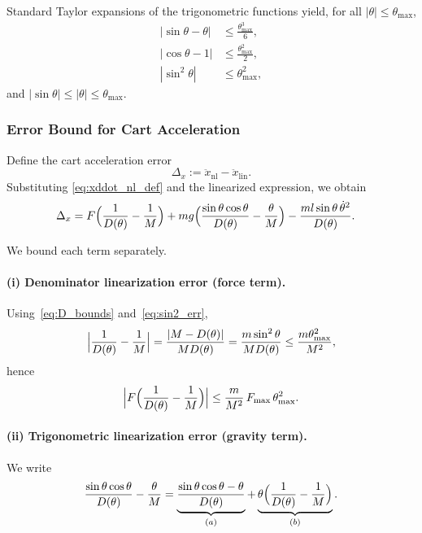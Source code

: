 \documentclass{article}
\begin{document}
Standard Taylor expansions of the trigonometric functions yield, for all $|\theta|\le\theta_{\max}$,
\begin{align}
|\sin\theta - \theta|
&\le \frac{\theta_{\max}^3}{6}, \label{eq:sin_err}\\
|\cos\theta - 1|
&\le \frac{\theta_{\max}^2}{2}, \label{eq:cos_err}\\
|\sin^2\theta|
&\le \theta_{\max}^2, \label{eq:sin2_err}
\end{align}
and $|\sin\theta| \le |\theta| \le \theta_{\max}$.

\subsubsection*{Error Bound for Cart Acceleration}

Define the cart acceleration error
\[
\Delta_x := \ddot x_{\mathrm{nl}} - \ddot x_{\mathrm{lin}}.
\]
Substituting \eqref{eq:xddot_nl_def} and the linearized expression, we obtain
\begin{align}
\Delta_x
&= F\Bigl(\frac{1}{D(\theta)} - \frac{1}{M}\Bigr)
 + m g\Bigl(\frac{\sin\theta\cos\theta}{D(\theta)}
            - \frac{\theta}{M}\Bigr)
 - \frac{m l\sin\theta\,\dot\theta^2}{D(\theta)}.
\end{align}

We bound each term separately.

\paragraph*{(i) Denominator linearization error (force term).}
Using~\eqref{eq:D_bounds} and~\eqref{eq:sin2_err},
\[
\Bigl|\frac{1}{D(\theta)} - \frac{1}{M}\Bigr|
= \frac{|M - D(\theta)|}{M D(\theta)}
= \frac{m\sin^2\theta}{M D(\theta)}
\le \frac{m\theta_{\max}^2}{M^2},
\]
hence
\begin{equation}
\Bigl|
F\Bigl(\frac{1}{D(\theta)} - \frac{1}{M}\Bigr)
\Bigr|
\le
\frac{m}{M^2}\,F_{\max}\,\theta_{\max}^2.
\label{eq:x_err_force}
\end{equation}

\paragraph*{(ii) Trigonometric linearization error (gravity term).}
We write
\[
\frac{\sin\theta\cos\theta}{D(\theta)} - \frac{\theta}{M}
=
\underbrace{\frac{\sin\theta\cos\theta - \theta}{D(\theta)}}_{(a)}
+
\underbrace{\theta\Bigl(\frac{1}{D(\theta)} - \frac{1}{M}\Bigr)}_{(b)}.
\]
\end{document}
